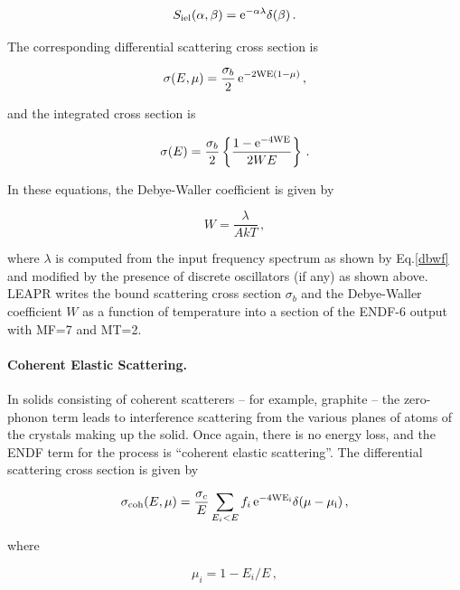 \begin{equation}
   S_{\rm iel}(\alpha,\beta)=\rm e^{-\alpha\lambda}\delta(\beta)\,.
\end{equation}

\noindent
The corresponding differential scattering cross section is

\begin{equation}
   \sigma(E,\mu)=\frac{\sigma_b}{2}\,\rm e^{-2WE(1-\mu)}\,,
\end{equation}

\noindent
and the integrated cross section is

\begin{equation}
   \sigma(E)=\frac{\sigma_b}{2}\left\{\frac{1-\rm e^{-4WE}}{2WE}\right\}\,.
\end{equation}

\noindent
In these equations, the Debye-Waller coefficient is given by

\begin{equation}
   W=\frac{\lambda}{AkT}\,,
\end{equation}

\noindent
where $\lambda$ is computed from the input frequency spectrum as shown
by Eq.\ref{dbwf} and modified by the presence of discrete
oscillators (if any) as shown above.  LEAPR writes the bound scattering
cross section $\sigma_b$ and the Debye-Waller coefficient $W$ as a
function of temperature into a section of the ENDF-6 output
with MF=7 and MT=2.

\paragraph{Coherent Elastic Scattering.}
In solids consisting of coherent scatterers -- for example, graphite -- the
zero-phonon term leads to interference scattering from the various planes
of atoms of the crystals making up the solid.  Once again, there is no
energy loss, and the ENDF term for the process is ``coherent elastic
scattering''.  The differential scattering cross section is given by

\begin{equation}
   \sigma_{\rm coh}(E,\mu)=\frac{\sigma_c}{E}
      \sum_{E_i<E}f_i\,\rm e^{-4WE_i}\delta(\mu-\mu_i)\,,
\end{equation}

\noindent
where

\begin{equation}
   \mu_i=1-E_i/E\,,
\end{equation}


